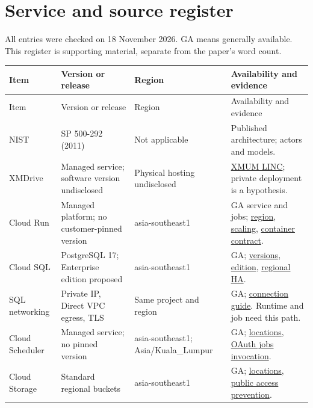 \section*{Service and source register}
All entries were checked on 18 November 2026. GA means generally available.
This register is supporting material, separate from the paper's word count.
\small
\begin{longtable}{@{}p{.19\linewidth}p{.25\linewidth}p{.20\linewidth}p{.27\linewidth}@{}}
\toprule
Item & Version or release & Region & Availability and evidence \\
\midrule
\endfirsthead
\toprule Item & Version or release & Region & Availability and evidence \\
\midrule
\endhead
NIST & SP 500-292 (2011) & Not applicable & Published architecture; actors and models. \\
XMDrive & Managed service; software version undisclosed & Physical hosting undisclosed & \href{https://linc.xmu.edu.my/online-storage/}{XMUM LINC}; private deployment is a hypothesis. \\
Cloud Run & Managed platform; no customer-pinned version & asia-southeast1 & GA service and jobs; \href{https://docs.cloud.google.com/run/docs/locations}{region}, \href{https://docs.cloud.google.com/run/docs/about-instance-autoscaling}{scaling}, \href{https://docs.cloud.google.com/run/docs/container-contract}{container contract}. \\
Cloud SQL & PostgreSQL 17; Enterprise edition proposed & asia-southeast1 & GA; \href{https://docs.cloud.google.com/sql/docs/postgres/db-versions}{versions}, \href{https://docs.cloud.google.com/sql/docs/postgres/choose-edition}{edition}, \href{https://docs.cloud.google.com/sql/docs/postgres/high-availability}{regional HA}. \\
SQL networking & Private IP, Direct VPC egress, TLS & Same project and region & GA; \href{https://docs.cloud.google.com/sql/docs/postgres/connect-run}{connection guide}. Runtime and job need this path. \\
Cloud Scheduler & Managed service; no pinned version & asia-southeast1; Asia/Kuala\_Lumpur & GA; \href{https://docs.cloud.google.com/scheduler/docs/locations}{locations}, \href{https://docs.cloud.google.com/run/docs/execute/jobs-on-schedule}{OAuth jobs invocation}. \\
Cloud Storage & Standard regional buckets & asia-southeast1 & GA; \href{https://docs.cloud.google.com/storage/docs/locations}{locations}, \href{https://docs.cloud.google.com/storage/docs/public-access-prevention}{public access prevention}. \\

\end{longtable}
